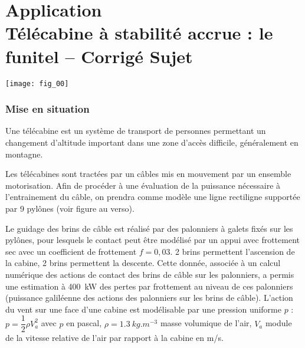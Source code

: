 \chapter*{Application  \\ 
Télécabine à stabilité accrue : le funitel -- \ifprof Corrigé \else Sujet \fi}

\iflivret {} \else
\ifprof  {} \else \fi
\fi

\setcounter{question}{0}
\begin{marginfigure}
\centering
\texttt{[image: fig\_00]}
\end{marginfigure}


\subsection*{Mise en situation}
\ifprof\else

Une télécabine est un système de transport de personnes permettant un changement d’altitude
important dans une zone d’accès difficile, généralement en montagne.

Les télécabines sont tractées par un câbles mis en mouvement par un ensemble motorisation. 
Afin de procéder à une évaluation de la puissance nécessaire à l’entrainement du câble, on
prendra comme modèle une ligne rectiligne supportée par 9 pylônes (voir figure au verso).


Le guidage des brins de câble est réalisé par des palonniers à galets fixés sur les pylônes,  pour lesquels le contact peut être modélisé par un appui avec frottement sec avec un coefficient de frottement $f = 0,03$. 2 brins permettent l'ascension de la cabine, 2 brins permettent la descente.
Cette donnée, associée à un calcul numérique des actions de contact des brins de câble sur les
palonniers, a permis une estimation à \SI{400}{kW} des pertes par frottement au niveau de ces
palonniers (puissance galiléenne des actions des palonniers sur les brins de câble).
L’action du vent sur une face d’une cabine est modélisable par une pression uniforme $p$ : $p=\dfrac{1}{2} \rho V_a^2$
avec $p$ en pascal, $\rho=\SI{1,3}{kg.m^{-3}}$ masse volumique de l’air, $V_a$ module de la vitesse relative de l’air par rapport à la cabine en m/s.



